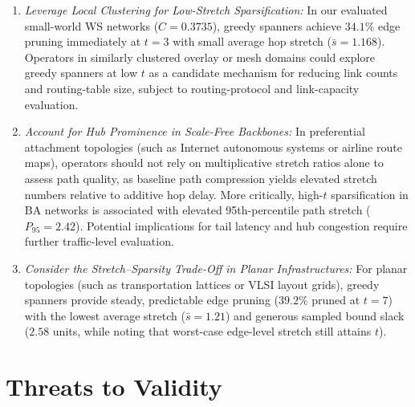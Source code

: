 \documentclass[conference]{IEEEtran}
\begin{document}
\begin{enumerate}
    \item \textit{Leverage Local Clustering for Low-Stretch Sparsification:} In our evaluated small-world WS networks ($C = 0.3735$), greedy spanners achieve $34.1\%$ edge pruning immediately at $t=3$ with small average hop stretch ($\bar{s} = 1.168$). Operators in similarly clustered overlay or mesh domains could explore greedy spanners at low $t$ as a candidate mechanism for reducing link counts and routing-table size, subject to routing-protocol and link-capacity evaluation.
    \item \textit{Account for Hub Prominence in Scale-Free Backbones:} In preferential attachment topologies (such as Internet autonomous systems or airline route maps), operators should not rely on multiplicative stretch ratios alone to assess path quality, as baseline path compression yields elevated stretch numbers relative to additive hop delay. More critically, high-$t$ sparsification in BA networks is associated with elevated 95th-percentile path stretch ($P_{95} = 2.42$). Potential implications for tail latency and hub congestion require further traffic-level evaluation.
    \item \textit{Consider the Stretch--Sparsity Trade-Off in Planar Infrastructures:} For planar topologies (such as transportation lattices or VLSI layout grids), greedy spanners provide steady, predictable edge pruning ($39.2\%$ pruned at $t=7$) with the lowest average stretch ($\bar{s} = 1.21$) and generous sampled bound slack ($2.58$ units, while noting that worst-case edge-level stretch still attains $t$).
\end{enumerate}

\section{Threats to Validity}
\end{document}
